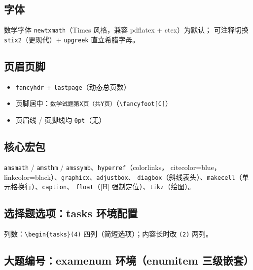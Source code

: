 \documentclass[11pt,a4paper]{ctexart}
\begin{document}
\subsection{字体}

数学字体 \texttt{newtxmath}（Times 风格，兼容 pdflatex + ctex）为默认；
可注释切换 \texttt{stix2}（更现代）+ \texttt{upgreek} 直立希腊字母。

\subsection{页眉页脚}

\begin{itemize}
  \item \texttt{fancyhdr} + \texttt{lastpage}（动态总页数）
  \item 页脚居中：\texttt{数学试题第X页（共Y页）}（\texttt{\textbackslash fancyfoot[C]}）
  \item 页眉线 / 页脚线均 \texttt{0pt}（无）
\end{itemize}

\subsection{核心宏包}

\texttt{amsmath} / \texttt{amsthm} / \texttt{amssymb}、\texttt{hyperref}（colorlinks，
citecolor=blue，linkcolor=black）、\texttt{graphicx}、\texttt{adjustbox}、
\texttt{diagbox}（斜线表头）、\texttt{makecell}（单元格换行）、\texttt{caption}、
\texttt{float}（[H] 强制定位）、\texttt{tikz}（绘图）。

\subsection{选择题选项：tasks 环境配置}

\begin{codeblock}
\end{codeblock}

列数：\texttt{\textbackslash begin\{tasks\}(4)} 四列（简短选项）；内容长时改 \texttt{(2)} 两列。

\subsection{大题编号：examenum 环境（enumitem 三级嵌套）}
\end{document}
